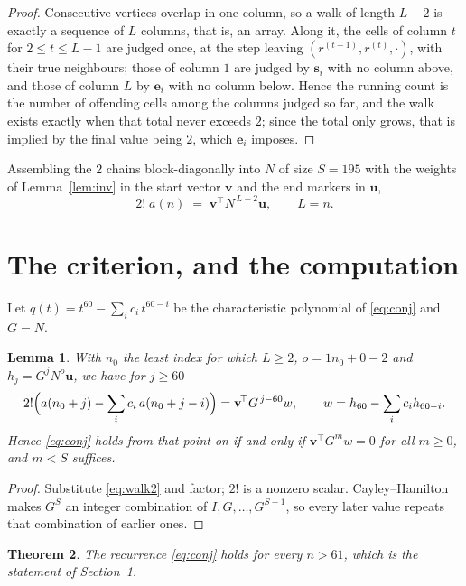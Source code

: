 \documentclass[11pt,a4paper]{article}
\theoremstyle{plain}
\newtheorem{theorem}{Theorem}
\newtheorem{lemma}[theorem]{Lemma}
\theoremstyle{definition}
\begin{document}
\begin{proof}
Consecutive vertices overlap in one column, so a walk of length $L-2$ is exactly a sequence
of $L$ columns, that is, an array. Along it, the cells of column $t$ for $2\le t\le L-1$ are
judged once, at the step leaving $(r^{(t-1)},r^{(t)},\cdot)$, with their true neighbours;
those of column $1$ are judged by $\mathbf{s}_i$ with no column above, and those of column
$L$ by $\mathbf{e}_i$ with no column below. Hence the running count is the number of
offending cells among the columns judged so far, and the walk exists exactly when that total
never exceeds $2$; since the total only grows, that is implied by the final value being
$2$, which $\mathbf{e}_i$ imposes.
\end{proof}

Assembling the $2$ chains block-diagonally into $N$ of size $S=195$ with the weights of
Lemma~\ref{lem:inv} in the start vector $\mathbf{v}$ and the end markers in
$\mathbf{u}$,
\begin{equation}\label{eq:walk2}
2!\;a(n)\;=\;\mathbf{v}^{\!\top}N^{\,L-2}\mathbf{u},\qquad L=n .
\end{equation}

\section{The criterion, and the computation}

Let $q(t)=t^{60}-\sum_i c_i\,t^{60-i}$ be the characteristic polynomial of
\eqref{eq:conj} and $G=N$.

\begin{lemma}\label{lem:crit}
With $n_0$ the least index for which $L\ge2$, $o=1n_0+0-2$ and
$h_j=G^{j}N^{o}\mathbf{u}$, we have for $j\ge60$
\[
2!\Bigl(a(n_0+j)-\sum_i c_i\,a(n_0+j-i)\Bigr)=\mathbf{v}^{\!\top}G^{\,j-60}w,
\qquad w=h_{60}-\sum_i c_i h_{60-i} .
\]
Hence \eqref{eq:conj} holds from that point on if and only if
$\mathbf{v}^{\!\top}G^{m}w=0$ for all $m\ge0$, and $m<S$ suffices.
\end{lemma}

\begin{proof}
Substitute \eqref{eq:walk2} and factor; $2!$ is a nonzero scalar. Cayley--Hamilton
makes $G^{S}$ an integer combination of $I,G,\dots,G^{S-1}$, so every later value repeats
that combination of earlier ones.
\end{proof}

\begin{theorem}
The recurrence \eqref{eq:conj} holds for every $n>61$, which is the statement of
Section~1.
\end{theorem}
\end{document}

